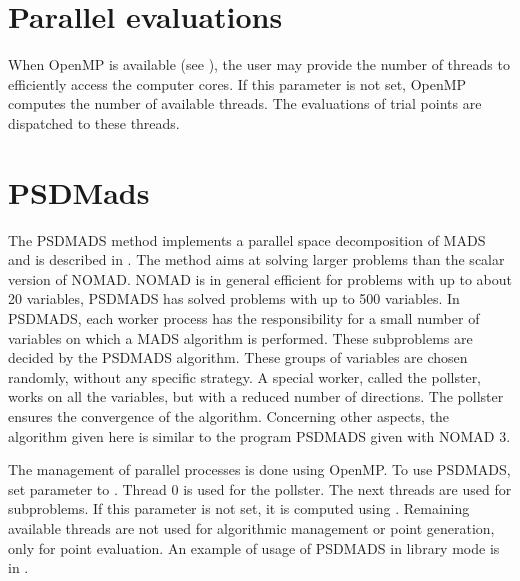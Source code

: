 \documentclass[letterpaper,10pt,english]{sphinxmanual}
\begin{document}
\section{Parallel evaluations}
\label{\detokenize{AdvancedFunctionalities:parallel-evaluations}}\label{\detokenize{AdvancedFunctionalities:id14}}
\sphinxAtStartPar
When OpenMP is available (see {\hyperref[\detokenize{Installation:cmake-configuration}]{}}), the user may provide the number of threads 
to efficiently access the computer cores. If this parameter is not set, OpenMP computes
the number of available threads. The evaluations of trial points are dispatched to these threads.


\section{PSD\sphinxhyphen{}Mads}
\label{\detokenize{AdvancedFunctionalities:psd-mads}}\label{\detokenize{AdvancedFunctionalities:id15}}
\sphinxAtStartPar
The PSD\sphinxhyphen{}MADS method implements a parallel space decomposition of MADS and is
described in . The method aims at solving larger problems than the scalar version of
NOMAD.
NOMAD is in general efficient for problems with up to about 20 variables, PSD\sphinxhyphen{}MADS has
solved problems with up to 500 variables.
In PSD\sphinxhyphen{}MADS, each worker process has the responsibility for a small number of variables on
which a MADS algorithm is performed. These subproblems are decided by the PSD\sphinxhyphen{}MADS algorithm.
These groups of variables
are chosen randomly, without any specific strategy.
A special worker, called the pollster,
works on all the variables, but with a reduced number of directions. The pollster ensures the
convergence of the algorithm.
Concerning other aspects, the algorithm given here is similar to the program PSD\sphinxhyphen{}MADS given
with NOMAD 3.

\sphinxAtStartPar
The management of parallel processes is done using OpenMP.
To use PSD\sphinxhyphen{}MADS, set parameter  to .
Thread 0 is used for the pollster.
The next  threads are used for subproblems. If this parameter is not
set, it is computed using .
Remaining available threads are not used for algorithmic management or point generation,
only for point evaluation.
An example of usage of PSD\sphinxhyphen{}MADS in library mode is in
.
\end{document}

